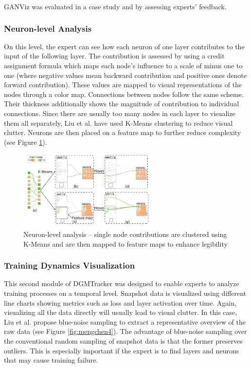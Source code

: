 \documentclass{acmsiggraph}               %
\begin{document}
GANViz was evaluated in a case study and by assessing experts' feedback.

\subsubsection{Neuron-level Analysis}
On this level, the expert can see how each neuron of one layer contributes to the input of the following layer. The contribution is assessed by using a credit assignment formula which maps each node's influence to a scale of minus one to one (where negative values mean backward contribution and positive ones denote forward contribution).
These values are mapped to visual representations of the nodes through a color map. Connections between nodes follow the same scheme. Their thickness additionally shows the magnitude of contribution to individual connections. Since there are usually too many nodes in each layer to visualize them all separately, Liu et al. have used K-Means clustering to reduce visual clutter. Neurons are then placed on a feature map to further reduce complexity (see Figure \ref{fig:mengchen3}).

\begin{figure}[!htb]
  \centering
  \includegraphics[width=2.75in]{mengchen3}
  \caption{Neuron-level analysis -- single node contributions are clustered using K-Means and are then mapped to feature maps to enhance legibility \protect\cite{Liu2018}}
  \label{fig:mengchen3}
\end{figure}

\subsubsection{Training Dynamics Visualization}
This second module of DGMTracker was designed to enable experts to analyze training processes on a temporal level.
Snapshot data is visualized using different line charts showing metrics such as loss and layer activation over time. Again, visualizing all the data directly will usually lead to visual clutter. In this case, Liu et al. propose blue-noise sampling to extract a representative overview of the raw data (see Figure \ref{fig:mengchen4}). The advantage of blue-noise sampling over the conventional random sampling of snapshot data is that the former preserves outliers. This is especially important if the expert is to find layers and neurons that may cause training failure.
\end{document}
